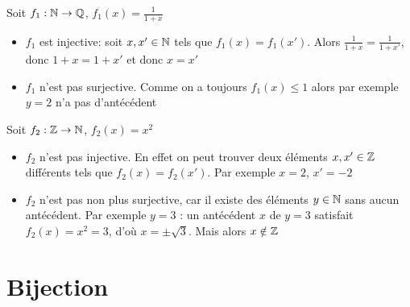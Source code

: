 

\begin{frame}
\begin{exemple}
Soit $f_1 : \mathbb{N} \to \mathbb{Q}$, \quad $f_1(x)= \frac{1}{1+x}$ \pause
  \begin{itemize}
     \item $f_1$ est injective: \pause
     soit $x,x'\in \mathbb{N}$ tels que $f_1(x)=f_1(x')$. \pause Alors $\frac{1}{1+x}=\frac{1}{1+x'}$\pause,
     donc $1+x=1+x'$ \pause et donc $x=x'$ \pause
     \item $f_1$ n'est pas surjective. \pause Comme on a toujours  $f_1(x) \le 1$ alors par exemple $y=2$ n'a pas d'antécédent 
  \end{itemize}
\end{exemple}

\pause

\begin{exemple}
 Soit $f_2 : \mathbb{Z} \to \mathbb{N}$, \quad $f_2(x)=x^2$ 
 \pause
  \begin{itemize}
     \item $f_2$ n'est pas injective. \pause
En effet on peut trouver deux éléments $x,x' \in \mathbb{Z}$ différents tels que $f_2(x)=f_2(x')$.
\pause
Par exemple $x=2$, $x'=-2$ 
\pause
     \item $f_2$ n'est pas non plus surjective, car il existe des éléments $y \in \mathbb{N}$ sans aucun antécédent. 
\pause
Par exemple $y=3$ : un antécédent $x$ de $y=3$ satisfait
$f_2(x)=x^2=3$, d'où $x = \pm \sqrt 3$. Mais alors $x \notin \mathbb{Z}$ 
  \end{itemize}
\end{exemple}
\end{frame}


\section{Bijection}

